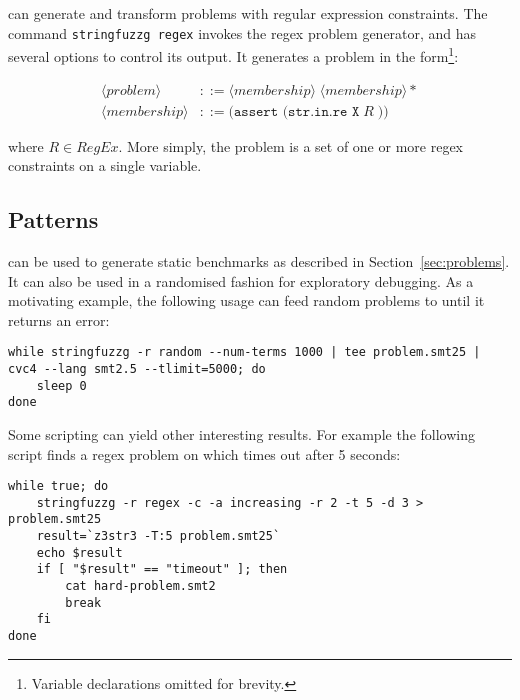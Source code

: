         \fuzzer{} can generate and transform problems with regular expression constraints. The command \texttt{stringfuzzg regex} invokes the regex problem generator, and has several options to control its output. It generates a problem in the form\footnote{Variable declarations omitted for brevity.}:

        \begin{align*}
            \langle problem \rangle  & ::= \langle membership \rangle \; \langle membership \rangle * \\
            \langle membership \rangle & ::= \texttt{(assert (str.in.re X}\; R\; \texttt{))}
        \end{align*}


        where $R \in RegEx$. More simply, the problem is a set of one or more regex constraints on a single variable.


    \subsection{Patterns}

        \fuzzer{} can be used to generate static benchmarks as described in Section~\ref{sec:problems}. It can also be used in a randomised fashion for exploratory debugging. As a motivating example, the following usage can feed random problems to \cvc{} until it returns an error:

        {\scriptsize\begin{verbatim}
while stringfuzzg -r random --num-terms 1000 | tee problem.smt25 | cvc4 --lang smt2.5 --tlimit=5000; do
    sleep 0
done\end{verbatim}}

        Some \unix{} scripting can yield other interesting results. For example the following script finds a regex problem on which \us{} times out after 5 seconds:

        {\scriptsize\begin{verbatim}while true; do
    stringfuzzg -r regex -c -a increasing -r 2 -t 5 -d 3 > problem.smt25
    result=`z3str3 -T:5 problem.smt25`
    echo $result
    if [ "$result" == "timeout" ]; then
        cat hard-problem.smt2
        break
    fi
done\end{verbatim}}

